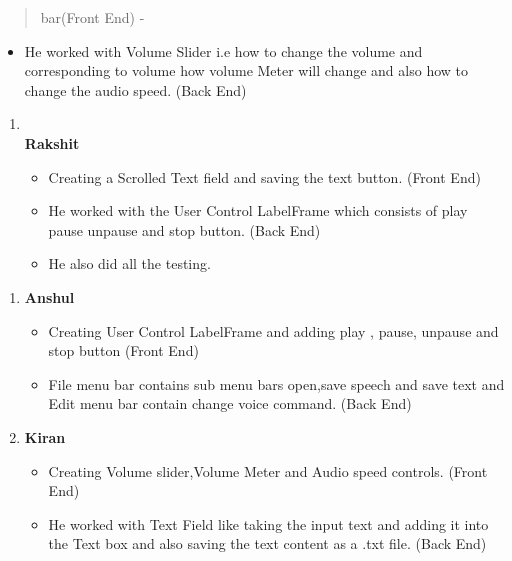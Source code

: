 \documentclass[]{article}
\begin{document}
\begin{quote}
bar(Front End) -
\end{quote}

\begin{itemize}
\item
  He worked with Volume Slider i.e how to change the volume and
  corresponding to volume how volume Meter will change and also how to
  change the audio speed. (Back End)
\end{itemize}

\begin{enumerate}
\def\labelenumi{\arabic{enumi}.}
\setcounter{enumi}{3}
\item
  \textbf{\\
  Rakshit}

  \begin{itemize}
  \item
    Creating a Scrolled Text ﬁeld and saving the text button. (Front
    End)
  \item
    He worked with the User Control LabelFrame which consists of play
    pause unpause and stop button. (Back End)
  \item
    He also did all the testing.
  \end{itemize}
\end{enumerate}

\begin{enumerate}
\def\labelenumi{\arabic{enumi}.}
\setcounter{enumi}{1}
\item
  \textbf{Anshul}

  \begin{itemize}
  \item
    Creating User Control LabelFrame and adding play , pause, unpause
    and stop button (Front End)
  \item
    File menu bar contains sub menu bars open,save speech and save text
    and Edit menu bar contain change voice command. (Back End)
  \end{itemize}
\item
  \textbf{Kiran}

  \begin{itemize}
  \item
    Creating Volume slider,Volume Meter and Audio speed controls. (Front
    End)
  \item
    He worked with Text Field like taking the input text and adding it
    into the Text box and also saving the text content as a .txt ﬁle.
    (Back End)
  \end{itemize}
\end{enumerate}
\end{document}
